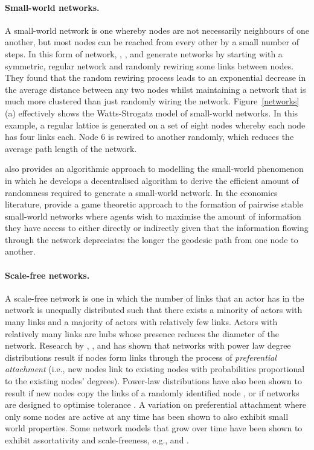 \paragraph{Small-world networks.}

A small-world network is one whereby nodes are not necessarily neighbours of one another, but most nodes can be reached from every other by a small number of steps. In this form of network, \citet{WattsStrogatz1998}, \citet{Watts1999}, and \citet{NewmanStrogatzWatts2001} generate networks by starting with a symmetric, regular network and randomly rewiring some links between nodes. They found that the random rewiring process leads to an exponential decrease in the average distance between any two nodes whilst maintaining a network that is much more clustered than just randomly wiring the network. Figure~\ref{networks} (a) effectively shows the Watts-Strogatz model of small-world networks. In this example, a regular lattice is generated on a set of eight nodes whereby each node has four links each. Node 6 is rewired to another randomly, which reduces the average path length of the network.

\citet{Kleinberg2000a, Kleinberg2000b} also provides an algorithmic approach to modelling the small-world phenomenon in which he develops a decentralised algorithm to derive the efficient amount of randomness required to generate a small-world network. In the economics literature, \citet{JacksonRogers2005} provide a game theoretic approach to the formation of pairwise stable small-world networks where agents wish to maximise the amount of information they have access to either directly or indirectly given that the information flowing through the network depreciates the longer the geodesic path from one node to another.

\paragraph{Scale-free networks.}

A scale-free network is one in which the number of links that an actor has in the network is unequally distributed such that there exists a minority of actors with many links and a majority of actors with relatively few links. Actors with relatively many links are hubs whose presence reduces the diameter of the network. Research by \citet{Price1976}, \citet{BarabasiAlbert1999}, and \citet{CooperFrieze2003} has shown that networks with power law degree distributions result if nodes form links through the process of \emph{preferential attachment} (i.e., new nodes link to existing nodes with probabilities proportional to the existing nodes' degrees). Power-law distributions have also been shown to result if new nodes copy the links of a randomly identified node \citep{Kleinberg1999, Kumar2000}, or if networks are designed to optimise tolerance \citep{Fabrikant2003}. A variation on preferential attachment where only some nodes are active at any time \citep{Klemm2002a} has been shown to also exhibit small world properties. Some network models that grow over time have been shown to exhibit assortativity and scale-freeness, e.g., \citet{Callaway2001} and \citet{Krapivsky2002}.

